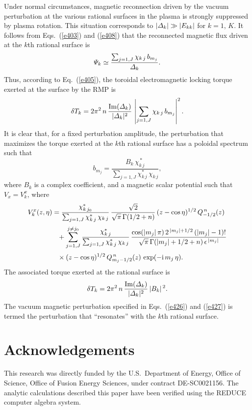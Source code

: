 \documentclass[12pt,prb,aps]{revtex4-1}
\begin{document}
Under normal circumstances, magnetic reconnection driven by the  vacuum perturbation at the various rational surfaces in the plasma 
is strongly suppressed by plasma rotation.\cite{am1,rfbook} This situation corresponds to $|{\mit\Delta}_k|\gg |E_{kk}|$ for $k=1$, $K$.
It follows from Eqs.~(\ref{e403}) and (\ref{e408}) that the reconnected magnetic flux driven at the $k$th rational surface is
\begin{equation}
{\mit\Psi}_k\simeq\frac{ \sum_{j=1,J}\chi_{k\,j}\,b_{m_j}}{{\mit\Delta}_k}.
\end{equation}
Thus, according to Eq.~(\ref{e405}), the toroidal electromagnetic locking torque exerted at the surface by the RMP is
\begin{equation}
\delta T_k = 2\pi^2\,n\,\frac{{\rm Im}({\mit\Delta}_k)}{|{\mit\Delta}_k|^2}\,\left|\sum_{j=1,J}\chi_{k\,j}\,b_{m_j}\right|^2.
\end{equation}
It is clear that, for a fixed perturbation amplitude, the perturbation that maximizes the torque exerted at the $k$th rational surface has a
poloidal spectrum such that 
\begin{equation}\label{e426}
b_{m_j}= \frac{B_k\,\chi_{k\,j}^{\,\ast}}{\sum_{j=1,J}\chi_{k\,j}^\ast\,\chi_{k\,j}},
\end{equation}
where $B_k$ is a complex coefficient, 
and a magnetic scalar potential such that $V_x= V_k^x$, where 
\begin{align}\label{e427}
V^x_k(z,\eta)&= \frac{\chi_{k\,j_0}^\ast}{\sum_{j=1,J}\chi_{k\,j}^\ast\,\chi_{k\,j}}\,\frac{\sqrt{2}}{\sqrt{\pi}\,\Gamma(1/2+n)}\,(z-\cos\eta)^{1/2}\,Q_{-1/2}^{\,n}(z)\nonumber\\[0.5ex]
&\phantom{=}+ \sum_{j=1,J}^{j\neq j_0} \frac{\chi_{k\,j}^\ast}{\sum_{j=1,J}\chi_{k\,j}^\ast\,\chi_{k\,j}}\,\frac{\cos(|m_j|\,\pi)\,2^{\,|m_j|+1/2}\,(|m_j|-1)!}{\sqrt{\pi}\,\Gamma(|m_j|+1/2+n)\,\epsilon^{\,|m_j|}}\nonumber\\[0.5ex]
&\phantom{=}\times
(z-\cos\eta)^{1/2}\,Q_{m_j-1/2}^{\,n}(z)\,\exp(-{\rm i}\,m_j\,\eta).
\end{align}
The associated torque exerted at the rational surface is
\begin{equation}
\delta T_k = 2\pi^2\,n\,\frac{{\rm Im}({\mit\Delta}_k)}{|{\mit\Delta}_k|^2}\,|B_k|^{\,2}.
\end{equation}
The vacuum magnetic perturbation specified in Eqs.~(\ref{e426}) and (\ref{e427}) is termed the perturbation that ``resonates'' with the $k$th
rational surface. 

\section*{Acknowledgements}
This research was directly funded by the U.S.\ Department of Energy, Office of Science, Office of Fusion Energy Sciences, under  contract DE-SC0021156. 
The analytic calculations  described  this paper have been verified using the {\sc REDUCE} computer algebra system.
\end{document}
